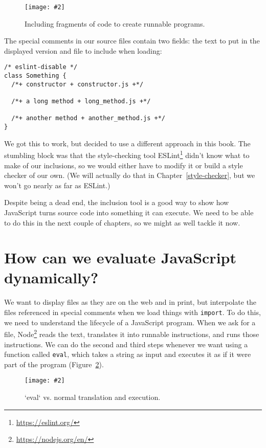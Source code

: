\documentclass[krantzl]{krantz}
\newcommand{\figpdf}[4]{\begin{figure}%
\centering%
\texttt{[image: \#2]}%
\caption{#3}%
\label{#1}%
\end{figure}}
\newcommand{\chapref}[1]{Chapter~\ref{#1}}
\newcommand{\figref}[1]{Figure~\ref{#1}}
\newcommand{\hreffoot}[2]{{#1}\footnote{\href{#2}{#2}}}
\begin{document}
\figpdf{file-interpolator-conceptual}{./file-interpolator/conceptual.pdf}{Including fragments of code to create runnable programs.}{0.6}


The special comments in our source files contain two fields:
the text to put in the displayed version
and file to include when loading:


\begin{lstlisting}[frame=single,frameround=tttt]
/* eslint-disable */
class Something {
  /*+ constructor + constructor.js +*/

  /*+ a long method + long_method.js +*/

  /*+ another method + another_method.js +*/
}
\end{lstlisting}



We got this to work,
but decided to use a different approach in this book.
The stumbling block was that the style-checking tool \hreffoot{ESLint}{https://eslint.org/}
didn't know what to make of our inclusions,
so we would either have to modify it or build a style checker of our own.
(We will actually do that in \chapref{style-checker},
but we won't go nearly as far as ESLint.)


Despite being a dead end,
the inclusion tool is a good way to show
how JavaScript turns source code into something it can execute.
We need to be able to do this in the next couple of chapters,
so we might as well tackle it now.

\section{How can we evaluate JavaScript dynamically?}\label{file-interpolator-dynamic}


We want to display files as they are on the web and in print,
but interpolate the files referenced in special comments
when we load things with \texttt{import}.
To do this,
we need to understand the lifecycle of a JavaScript program.
When we ask for a file,
\hreffoot{Node}{https://nodejs.org/en/} reads the text,
translates it into runnable instructions,
and runs those instructions.
We can do the second and third steps whenever we want using a function called \texttt{eval},
which takes a string as input and executes it as if it were part of the program
(\figref{file-interpolator-eval}).

\figpdf{file-interpolator-eval}{./file-interpolator/eval.pdf}{`eval` vs. normal translation and execution.}{0.6}
\end{document}
